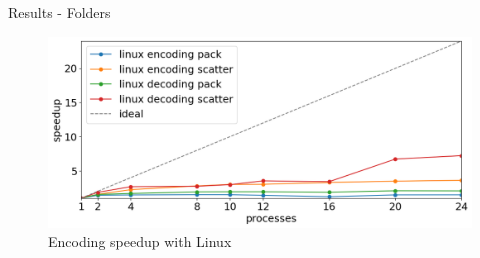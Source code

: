 \begin{frame}{Results - Folders}

        \begin{figure}
            \centering
            \includegraphics[width=\textwidth]{imgs/linux speedup.png}
            \caption{Encoding speedup with Linux}
            \label{fig:encoding-linux}
        \end{figure}
\end{frame}
